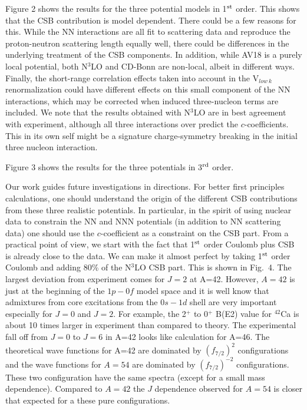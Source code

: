 \documentclass[
10pt,
showpacs,preprintnumbers,footinbib,
amsmath,amssymb,
aps,
prl,twocolumn,groupedaddress,superscriptaddress,
showkeys
]{revtex4-1}
\begin{document}
Figure 2 shows the results for the three potential models in 1$^{\rm st}$ order.
This shows that the CSB contribution is model dependent.
There could be a few reasons for this. While the NN interactions
are all fit to scattering data and reproduce the proton-neutron scattering length equally well, 
there could be differences in the underlying treatment of the CSB components.
In addition, while AV18 is a purely local potential, both N$^3$LO and CD-Bonn
are non-local, albeit in different ways. Finally, the short-range correlation effects
taken into account in the V$_{low~k}$ renormalization could have different 
effects on this small component of the NN interactions, which may be corrected 
when induced three-nucleon terms are included.
We note that the results obtained with N$^3$LO are in best agreement 
with experiment, although all three interactions over predict the $c$-coefficients. This
in its own self might be a signature charge-symmetry breaking in the initial three nucleon
interaction.  

Figure 3 shows the results for the three potentials in 3$^{\rm rd}$ order.

Our work guides future investigations in directions.
For better first principles calculations, one should
understand the origin of the
different CSB contributions from these three realistic potentials.
In particular, in the spirit of using nuclear data to
constrain the NN and NNN potentials (in addition to NN scattering
data) one should use the $c$-coefficient as a constraint on the
CSB part. From a practical point of view, we start with the
fact that 1$^{\rm st}$ order Coulomb plus CSB is already close to the data.
We can make it almost perfect by taking 1$^{\rm st}$ order Coulomb
and adding 80\% of the N$^3$LO CSB part. This is shown in Fig.~4.
The largest deviation from experiment comes for $  J=2  $ at A=42.
However, $ A=42 $ is just at the beginning of the $  1p-0f  $
model space and it is well know that admixtures from
core excitations from the
$0s-1d $ shell are very important especially for $J=0$ and $J=2$.
For example, the 2$^{ + }$ to 0$^{ + }$ B(E2) value for $^{42}$Ca is about 10 times
larger in experiment than compared to theory. The experimental
fall off from $  J=0  $ to $  J=6  $ in A=42 looks like calculation
for A=46. The theoretical wave functions for
A=42 are dominated by $  (f_{7/2})^{2}  $ configurations
and the wave functions for $  A=54  $ are dominated by
$  (f_{7/2})^{-2}  $ configurations. These two configuration
have the same spectra (except for a small mass dependence).
Compared to $  A=42  $ the
$  J  $ dependence observed for $  A=54  $ is closer that
expected for a these pure configurations.
\end{document}
